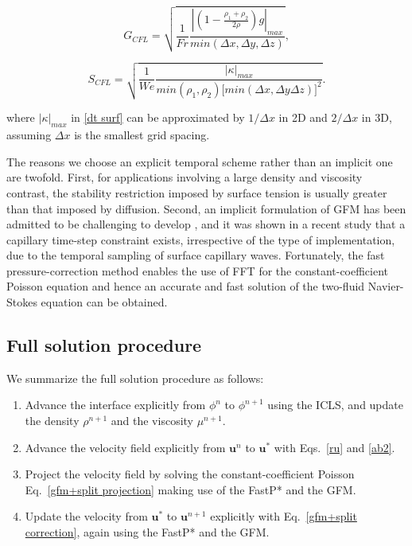 \begin{equation}
  G_{CFL} = \sqrt{\frac{1}{Fr}\frac{|(1-\tfrac{\rho_1+\rho_2}{2\rho}) g|_{max}}{min (\Delta x,\Delta y,\Delta z)} },
  \label{dt grav}
\end{equation}

\begin{equation}
  S_{CFL} = \sqrt{\frac{1}{We}\frac{|\kappa|_{max}}{min(\rho_1,\rho_2) \big[min(\Delta x,\Delta y\Delta z)\big]^2}}.
  \label{dt surf}
\end{equation}

\noindent where $|\kappa|_{max}$ in \eqref{dt surf} can be approximated by $1/\Delta x$ in 2D and $2/\Delta x$ in 3D, assuming $\Delta x$ is the smallest grid spacing.

The reasons we choose an explicit temporal scheme rather than an implicit one are twofold. First, for applications involving a large density and viscosity contrast, the stability restriction imposed by surface tension is usually greater than that imposed by diffusion. Second, an implicit formulation of GFM has been admitted to be challenging to develop \citep{Desjardins_JCP_2008}, and it was shown in a recent study \citep{Denner&Wachem_JCP_2015} that a capillary time-step constraint exists, irrespective of the type of implementation, due to the temporal sampling of surface capillary waves. Fortunately, the fast pressure-correction method enables the use of FFT for the constant-coefficient Poisson equation and hence an accurate and fast solution of the two-fluid Navier-Stokes equation can be obtained.




\subsection{Full solution procedure}
\label{sec: procedure}

We summarize the full solution procedure as follows:

\begin{enumerate}

    \item Advance the interface explicitly from $\phi^{n}$ to $\phi^{n+1}$ using the ICLS, and update the density $\rho^{n+1}$ and the viscosity $\mu^{n+1}$.
    
    \item Advance the velocity field explicitly from ${\bm u}^{n}$ to ${\bm u}^{*}$ with Eqs.\ \eqref{ru} and \eqref{ab2}.
    
    \item Project the velocity field by solving the constant-coefficient Poisson Eq.\ \eqref{gfm+split projection} making use of the FastP* and the GFM.
    
    \item Update the velocity from ${\bm u}^{*}$ to ${\bm u}^{n+1}$ explicitly with Eq.\ \eqref{gfm+split correction}, again using the FastP* and the GFM.

\end{enumerate}



